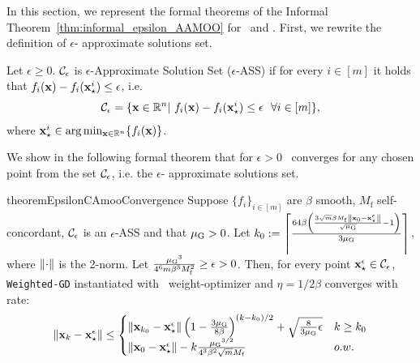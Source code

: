 In this section, we represent the formal theorems of the Informal Theorem~\ref{thm:informal_epsilon_AAMOO} for \CAMOO ~and \PAMOO. First, we
rewrite the definition of $\epsilon$- approximate solutions set.

\begin{definition} \label{def:epsilon_app_solution_set}
     Let $\epsilon \geq 0$. $\mathcal{C}_\epsilon$ is $\epsilon$-Approximate Solution Set ($\epsilon$-ASS) if for every $i \in [m]$ it holds that $f_i({\mathbf{x}}) - f_i({\mathbf{x}}_{\star}^i) \leq \epsilon$, i.e.
    \begin{align*}
        \mathcal{C}_\epsilon = \{ {\mathbf{x}} \in \mathbb{R}^n | \ f_i({\mathbf{x}}) - f_i({\mathbf{x}}_{\star}^i) \leq \epsilon ~~ \forall i\in[m] \},
    \end{align*}
    where ${\mathbf{x}}_\star^i \in \arg\min_{{\mathbf{x}} \in \mathbb{R}^n} \{ f_i({\mathbf{x}}) \}$.
\end{definition}

We show in the following formal theorem that for $\epsilon>0$ \CAMOO ~converges for any chosen point from the set $\mathcal{C}_\epsilon$, i.e. the $\epsilon$- approximate solutions set.

\begin{restatable}{theorem}{EpsilonCAmooConvergence}
\label{thm:epsilon_camoo_convergence}
        Suppose $\{f_i\}_{i\in [m]}$ are $\beta$ smooth, $M_{\mathrm{f}}$ self-concordant, $\mathcal{C}_\epsilon$ is an $\epsilon$-ASS and that ${\mu_{\mathrm{G}}} > 0$. Let $k_0 := \left\lceil \frac{64 \beta  \left(\frac{3 \sqrt{m}\beta M_{\mathrm{f}} \left\Vert{\mathbf{x}}_0 - {{\mathbf{x}}_\star^\epsilon}\right\Vert }{\sqrt{{\mu_{\mathrm{G}}}}}-1\right) }{ 3{\mu_{\mathrm{G}}}}\right\rceil$, where $\left\Vert\cdot\right\Vert$ is the 2-norm. Let $ \frac{{\mu_{\mathrm{G}}}^3 }{4^6 m \beta^3 M_{\mathrm{f}}^2} \geq \epsilon > 0$. Then, for every point ${{\mathbf{x}}_\star^\epsilon} \in \mathcal{C}_\epsilon$, \texttt{Weighted-GD} instantiated with \CAMOO\ weight-optimizer and $\eta = 1/2\beta$ converges with rate:
    \begin{align*}
        \left\Vert{\mathbf{x}}_{k} - {{\mathbf{x}}_\star^\epsilon}\right\Vert \leq 
        \begin{cases}
            \left\Vert{\mathbf{x}}_{k_0} - {{\mathbf{x}}_\star^\epsilon}\right\Vert \left(1-\frac{3{\mu_{\mathrm{G}}}}{8\beta}\right)^{(k-k_0)/2} + \sqrt{\frac{8  }{ 3 {\mu_{\mathrm{G}}}}\epsilon} & k\geq k_0\\
            \left\Vert{\mathbf{x}}_0 - {{\mathbf{x}}_\star^\epsilon}\right\Vert- k \frac{{\mu_{\mathrm{G}}}^{3/2}}{4^3 \beta^2 \sqrt{m} M_{\mathrm{f}}} & o.w.
        \end{cases}
    \end{align*}
\end{restatable}

